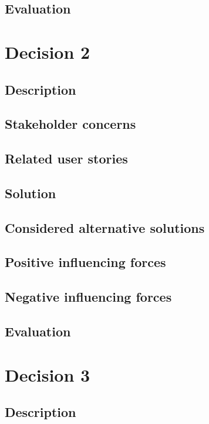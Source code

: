 \documentclass[12pt, a4paper]{article}
\begin{document}
\subsection{Evaluation}

\newpage
\section{Decision 2}
\subsection{Description}

\subsection{Stakeholder concerns}

\subsection{Related user stories}

\subsection{Solution}

\subsection{Considered alternative solutions}

\subsection{Positive influencing forces}

\subsection{Negative influencing forces}

\subsection{Evaluation}

\newpage
\section{Decision 3}
\subsection{Description}
\end{document}
